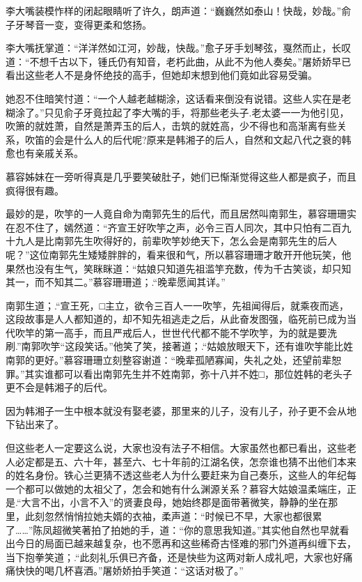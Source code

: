 \documentclass[12pt,oneside]{book}
\begin{document}
李大嘴装模怍样的闭起眼睛听了许久，朗声道：``巍巍然如泰山！快哉，妙哉。''俞子牙琴音一变，变得更柔和悠扬。

李大嘴抚掌道：``洋洋然如江河，妙哉，快哉。''愈子牙手划琴弦，戛然而止，长叹道：``不想千古以下，锺氏仍有知音，老朽此曲，从此不为他人奏矣。''屠娇娇早已看出这些老人不是身怀绝技的高手，但她却末想到他们竟如此容易受骗。

她忍不住暗笑忖道：``一个人越老越糊涂，这话看来倒没有说错。这些人实在是老糊涂了。''只见俞子牙竟拉起了李大嘴的手，将那些老头子.老太婆一一为他引见，吹箫的就姓萧，自然是萧弄玉的后人，击筑的就姓高，少不得也和高渐离有些关系，吹笛的会是什么人的后代呢?原来是韩湘子的后人，自然和文起八代之衰的韩愈也有亲戚关系。

慕容姊妹在一旁听得真是几乎要笑破肚子，她们已惭渐觉得这些人都是疯子，而且疯得很有趣。

最妙的是，吹竽的一人竟自命为南郭先生的后代，而且居然叫南郭生，慕容珊珊实在忍不住了，嫣然道：``齐宣王好吹竽之声，必令三百人同次，其中只怕有二百九十九人是比南郭先生吹得好的，前辈吹竽妙绝天下，怎么会是南郭先生的后人呢？''这位南郭先生矮矮胖胖的，看来很和气，所以慕容珊珊才敢开开他玩笑，他果然也没有生气，笑眯眯道：``姑娘只知道先祖滥竽充数，传为千古笑谈，却只知其一，而不知其二。''慕容珊珊道；.``晚辈愿闻其详。''

南郭生道；.``宣王死，□主立，欲令三百人一一吹竽，先祖闻得后，就乘夜而逃，这段故事是人人都知道的，却不知先祖逃走之后，从此奋发图强，临死前已成为当代吹竿的第一高手，而且严戒后人，世世代代都不能不学吹竽，为的就是要洗刷.''南郭吹竽``这段笑话。''他笑了笑，接著道；.``姑娘放眼天下，还有谁吹竽能比姓南郭的更好。''慕容珊珊立刻整容谢道：``晚辈孤陋寡闻，失礼之处，还望前辈恕罪。''其实谁都可以看出南郭先生并不姓南郭，弥十八并不姓□，那位姓韩的老头子更不会是韩湘子的后代。

因为韩湘子一生中根本就没有娶老婆，那里来的儿子，没有儿子，孙子更不会从地下钻出来了。

但这些老人一定要这么说，大家也没有法子不相信。大家虽然也都已看出，这些老人必定都是五、六十年，甚至六、七十年前的江湖名侠，怎奈谁也猜不出他们本来的姓名身份。铁心兰更猜不透这些老人为什么要赶来为自己奏乐，这些人的年纪每一个都可以做她的太祖父了，怎会和她有什么渊源关系？慕容大姑娘温柔端庄，正是.``大言不出，小言不入''的贤妻良母，她始终郡是面带著微笑，静静的坐在那里，此刻忽然悄悄拉她夫婿的衣袖，柔声道：``时候已不早，大家也都很累了\ldots\ldots{}''陈凤超微笑著拍了拍她的手，道：``你的意思我知道。''其实他自然也早就看出今日的局面已越来越复杂，也不愿再和这些稀奇古怪难的邪门外道再纠缠下去，当下抱拳笑道；.``此刻礼乐俱已齐备，还是快些为这两对新人成礼吧，大家也好痛痛快快的喝几杯喜酒。''屠娇娇拍手笑道：``这话对极了。''
\end{document}

